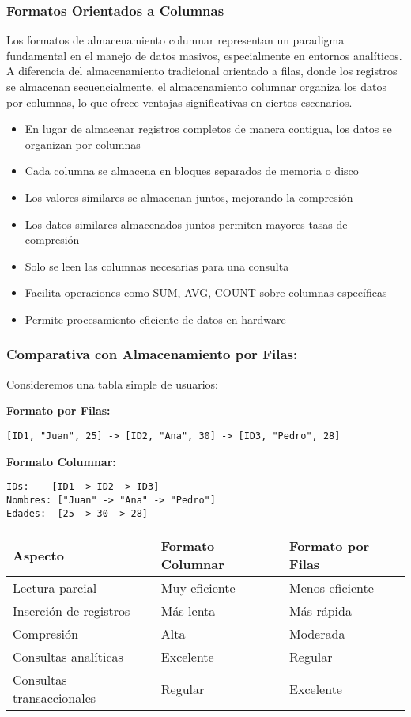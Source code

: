 \subsubsection{Formatos Orientados a Columnas}

Los formatos de almacenamiento columnar representan un paradigma fundamental en el manejo de datos masivos, 
especialmente en entornos analíticos. A diferencia del almacenamiento tradicional orientado a filas, 
donde los registros se almacenan secuencialmente, el almacenamiento columnar organiza los datos por columnas, 
lo que ofrece ventajas significativas en ciertos escenarios.

\begin{itemize}
    \item En lugar de almacenar registros completos de manera contigua, los datos se organizan por columnas
    \item Cada columna se almacena en bloques separados de memoria o disco
    \item Los valores similares se almacenan juntos, mejorando la compresión
    \item Los datos similares almacenados juntos permiten mayores tasas de compresión
    \item Solo se leen las columnas necesarias para una consulta
    \item Facilita operaciones como SUM, AVG, COUNT sobre columnas específicas
    \item Permite procesamiento eficiente de datos en hardware
\end{itemize}

\subsubsection{Comparativa con Almacenamiento por Filas:}

Consideremos una tabla simple de usuarios:

\textbf{Formato por Filas:}
\begin{verbatim}
[ID1, "Juan", 25] -> [ID2, "Ana", 30] -> [ID3, "Pedro", 28]
\end{verbatim}

\textbf{Formato Columnar:}
\begin{verbatim}
IDs:    [ID1 -> ID2 -> ID3]
Nombres: ["Juan" -> "Ana" -> "Pedro"]
Edades:  [25 -> 30 -> 28]
\end{verbatim}

\begin{tabular}{|l|l|l|}
\hline
\textbf{Aspecto} & \textbf{Formato Columnar} & \textbf{Formato por Filas} \\
\hline
Lectura parcial & Muy eficiente & Menos eficiente \\
Inserción de registros & Más lenta & Más rápida \\
Compresión & Alta & Moderada \\
Consultas analíticas & Excelente & Regular \\
Consultas transaccionales & Regular & Excelente \\
\hline
\end{tabular}

